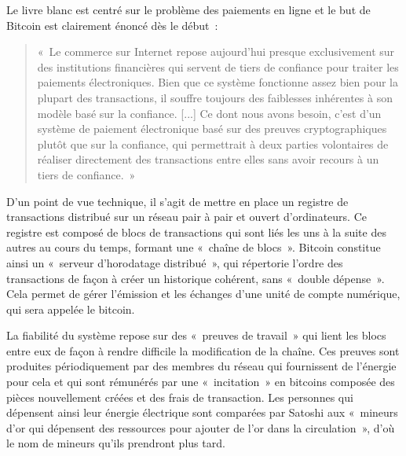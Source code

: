 Le livre blanc est centré sur le problème des paiements en ligne et le but de Bitcoin est clairement énoncé dès le début~:

\begin{quote}
«~Le commerce sur Internet repose aujourd'hui presque exclusivement sur des institutions financières qui servent de tiers de confiance pour traiter les paiements électroniques. Bien que ce système fonctionne assez bien pour la plupart des transactions, il souffre toujours des faiblesses inhérentes à son modèle basé sur la confiance. [...] Ce dont nous avons besoin, c'est d'un système de paiement électronique basé sur des preuves cryptographiques plutôt que sur la confiance, qui permettrait à deux parties volontaires de réaliser directement des transactions entre elles sans avoir recours à un tiers de confiance.~»
\end{quote}



D'un point de vue technique, il s'agit de mettre en place un registre de transactions distribué sur un réseau pair à pair et ouvert d'ordinateurs. Ce registre est composé de blocs de transactions qui sont liés les uns à la suite des autres au cours du temps, formant une «~chaîne de blocs~». Bitcoin constitue ainsi un «~serveur d'horodatage distribué~», qui répertorie l'ordre des transactions de façon à créer un historique cohérent, sans «~double dépense~». Cela permet de gérer l'émission et les échanges d'une unité de compte numérique, qui sera appelée le bitcoin.

La fiabilité du système repose sur des «~preuves de travail~» qui lient les blocs entre eux de façon à rendre difficile la modification de la chaîne. Ces preuves sont produites périodiquement par des membres du réseau qui fournissent de l'énergie pour cela et qui sont rémunérés par une «~incitation~» en bitcoins composée des pièces nouvellement créées et des frais de transaction. Les personnes qui dépensent ainsi leur énergie électrique sont comparées par Satoshi aux «~mineurs d'or qui dépensent des ressources pour ajouter de l'or dans la circulation~», d'où le nom de mineurs qu'ils prendront plus tard.

